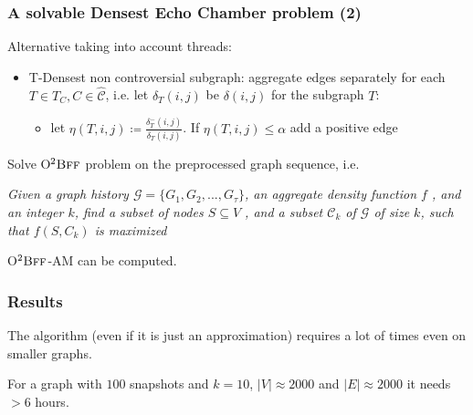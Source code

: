 \documentclass{beamer}
\begin{document}
\begin{frame}[c]
	\frametitle{A solvable Densest Echo Chamber problem (2)}
	Alternative taking into account threads:

	\begin{itemize}
		\item T-Densest non controversial subgraph: aggregate edges separately for each $T \in T_{C}, C \in
			      \hat{\mathcal{C}}$, i.e. let $\delta_{T}(i,j) $ be $\delta(i, j)$
		      for the subgraph $T$:
		      \begin{itemize}
			      \item let $\eta(T, i,j) \coloneqq \frac{\delta_{T} ^{-}
					            (i,j)}{\delta _{T} (i,j)} $. If $\eta(T, i,j) \leq \alpha
			            $ add a positive edge
		      \end{itemize}
	\end{itemize}

	Solve O$^{2} \textsc{Bff}$ problem on the preprocessed graph
	sequence, i.e.

	\bigskip

	\emph{Given a graph history $\mathcal{G}  = \{G_1 , G_2, . . . ,
			G_{\tau}  \}$, an aggregate density function $f$ , and an
		integer $k$, find a subset of nodes $S \subseteq V$ , and a
		subset $\mathcal{C} _{k} $ of $\mathcal{G} $ of size $k$,
		such that $f (S, C_k )$ is maximized}

	\bigskip

	O$^{2} \textsc{Bff}$-AM can be computed.
\end{frame}

\begin{frame}[c]
	\frametitle{Results}

	The algorithm (even if it is just an approximation) requires a lot of times
	even on smaller graphs.

	\bigskip

	For a graph with $100$ snapshots and $k = 10$, $|V| \approx 2000$ and $|E|
		\approx 2000$ it needs $> 6 $ hours.

\end{frame}
\end{document}
